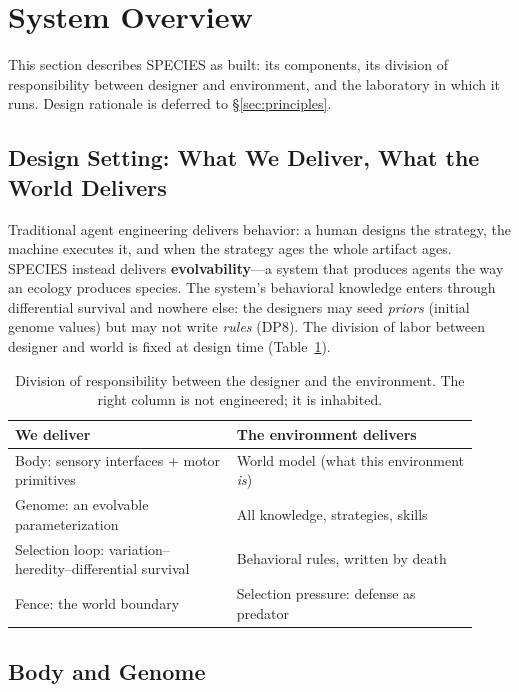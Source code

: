 \documentclass[11pt,a4paper]{article}
\begin{document}
\section{System Overview}
\label{sec:overview}

This section describes SPECIES as built: its components, its division of responsibility between designer and environment, and the laboratory in which it runs. Design rationale is deferred to \S\ref{sec:principles}.

\subsection{Design Setting: What We Deliver, What the World Delivers}
\label{sec:setting}

Traditional agent engineering delivers behavior: a human designs the strategy, the machine executes it, and when the strategy ages the whole artifact ages. SPECIES instead delivers \textbf{evolvability}---a system that produces agents the way an ecology produces species. The system's behavioral knowledge enters through differential survival and nowhere else: the designers may seed \emph{priors} (initial genome values) but may not write \emph{rules} (DP8). The division of labor between designer and world is fixed at design time (Table~\ref{tab:division}).

\begin{table}[t]
\centering\small
\caption{Division of responsibility between the designer and the environment. The right column is not engineered; it is inhabited.}
\label{tab:division}
\begin{tabular}{@{}p{0.44\linewidth}p{0.48\linewidth}@{}}
\toprule
\textbf{We deliver} & \textbf{The environment delivers}\\
\midrule
Body: sensory interfaces + motor primitives & World model (what this environment \emph{is})\\
Genome: an evolvable parameterization & All knowledge, strategies, skills\\
Selection loop: variation--heredity--differential survival & Behavioral rules, written by death\\
Fence: the world boundary & Selection pressure: defense as predator\\
\bottomrule
\end{tabular}
\end{table}

\subsection{Body and Genome}
\label{sec:body}
\end{document}

